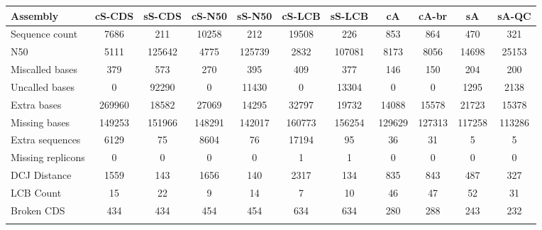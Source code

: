 \documentclass{bioinfo}
\begin{document}
\begin{table}[!t] 
{\begin{tabular}{l|cccccccccc}\toprule
Assembly           & cS-CDS & sS-CDS & cS-N50 & sS-N50 & cS-LCB & sS-LCB & cA     & cA-br  & sA     & sA-QC   \\\midrule
Sequence count     & 7686   & 211    & 10258  & 212    & 19508  & 226    & 853    & 864    & 470    & 321     \\
N50                & 5111   & 125642 & 4775   & 125739 & 2832   & 107081 & 8173   & 8056   & 14698  & 25153   \\
Miscalled bases    & 379    & 573    & 270    & 395    & 409    & 377    & 146    & 150    & 204    & 200     \\
Uncalled bases     & 0      & 92290  & 0      & 11430  & 0      & 13304  & 0      & 0      & 1295   & 2138    \\
Extra bases        & 269960 & 18582  & 27069  & 14295  & 32797  & 19732  & 14088  & 15578  & 21723  & 15378   \\
Missing bases      & 149253 & 151966 & 148291 & 142017 & 160773 & 156254 & 129629 & 127313 & 117258 & 113286  \\
Extra sequences    & 6129   & 75     & 8604   & 76     & 17194  & 95     & 36     & 31     & 5      & 5       \\
Missing replicons  & 0      & 0      & 0      & 0      & 1      & 1      & 0      & 0      & 0      & 0       \\
DCJ Distance       & 1559   & 143    & 1656   & 140    & 2317   & 134    & 835    & 843    & 487    & 327     \\
LCB Count          & 15     & 22     & 9      & 14     & 7      & 10     & 46     & 47     & 52     & 31      \\
Broken CDS         & 434    & 434    & 454    & 454    & 634    & 634    & 280    & 288    & 243    & 232     \\
\botrule \\
\end{tabular}}{}
\end{table}
\end{document}
